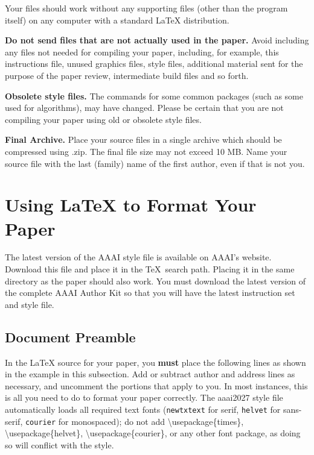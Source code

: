 Your files should work without any supporting files (other than the program itself) on any computer with a standard \LaTeX{} distribution.

\textbf{Do not send files that are not actually used in the paper.} Avoid including any files not needed for compiling your paper, including, for example, this instructions file, unused graphics files, style files, additional material sent for the purpose of the paper review, intermediate build files and so forth.

\textbf{Obsolete style files.} The commands for some common packages (such as some used for algorithms), may have changed. Please be certain that you are not compiling your paper using old or obsolete style files.

\textbf{Final Archive.} Place your source files in a single archive which should be compressed using .zip. The final file size may not exceed 10 MB.
Name your source file with the last (family) name of the first author, even if that is not you.


\section{Using \LaTeX{} to Format Your Paper}

The latest version of the AAAI style file is available on AAAI's website. Download this file and place it in the \TeX\ search path. Placing it in the same directory as the paper should also work. You must download the latest version of the complete AAAI Author Kit so that you will have the latest instruction set and style file.

\subsection{Document Preamble}

In the \LaTeX{} source for your paper, you \textbf{must} place the following lines as shown in the example in this subsection. Add or subtract author and address lines as necessary, and uncomment the portions that apply to you. In most instances, this is all you need to do to format your paper correctly. The aaai2027 style file automatically loads all required text fonts (\texttt{newtxtext} for serif, \texttt{helvet} for sans-serif, \texttt{courier} for monospaced); do not add \textbackslash usepackage\{times\}, \textbackslash usepackage\{helvet\}, \textbackslash usepackage\{courier\}, or any other font package, as doing so will conflict with the style.

